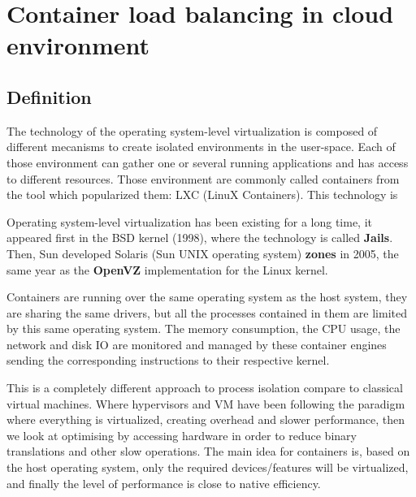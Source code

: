\chapter{Container load balancing in cloud environment}
\label{mainidea}

\section{Definition}

The technology of the operating system-level virtualization is composed of
different mecanisms to create isolated environments in the user-space.  Each of
those environment can gather one or several running applications and has access
to different resources. Those environment are commonly called containers from
the tool which popularized them: LXC (LinuX Containers). This technology is 

Operating system-level virtualization has been existing for a long time, it
appeared first in the BSD kernel (1998), where the technology is called
\textbf{Jails}.  Then, Sun developed Solaris (Sun UNIX operating system)
\textbf{zones} in 2005, the same year as the \textbf{OpenVZ} implementation for
the Linux kernel.

Containers are running over the same operating system as the host system, they
are sharing the same drivers, but all the processes contained in them are
limited by this same operating system. The memory consumption, the CPU usage,
the network and disk IO are monitored and managed by these container engines
sending the corresponding instructions to their respective kernel. 

This is a completely different approach to process isolation compare to
classical virtual machines. Where hypervisors and VM have been following the
paradigm where everything is virtualized, creating overhead and slower
performance, then we look at optimising by accessing hardware in order to
reduce binary translations and other slow operations. The main idea for
containers is, based on the host operating system, only the required
devices/features will be virtualized, and finally the level of performance is
close to native efficiency.

